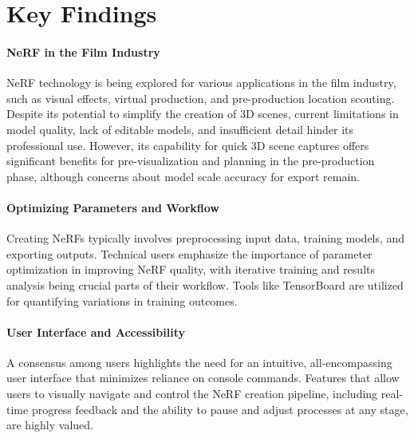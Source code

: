 \section{Key Findings}
\label{sec:user-research:findings}


\paragraph{NeRF in the Film Industry}
NeRF technology is being explored for various applications in the film industry, such as visual effects, virtual production, and pre-production location scouting. 
Despite its potential to simplify the creation of 3D scenes, current limitations in model quality, lack of editable models, and insufficient detail hinder its professional use. 
However, its capability for quick 3D scene captures offers significant benefits for pre-visualization and planning in the pre-production phase, although concerns about model scale accuracy for export remain. 
\cite{P2, P4}



\paragraph{Optimizing Parameters and Workflow}
Creating NeRFs typically involves preprocessing input data, training models, and exporting outputs. 
Technical users emphasize the importance of parameter optimization in improving NeRF quality, with iterative training and results analysis being crucial parts of their workflow.
Tools like TensorBoard \cite{noauthor_tensorflowtensorboard_2024} are utilized for quantifying variations in training outcomes. 
\cite{P1, P3}


\paragraph{User Interface and Accessibility}
A consensus among users highlights the need for an intuitive, all-encompassing user interface that minimizes reliance on console commands. 
Features that allow users to visually navigate and control the NeRF creation pipeline, including real-time progress feedback and the ability to pause and adjust processes at any stage, are highly valued. 
\cite{P1, P2, P3}

